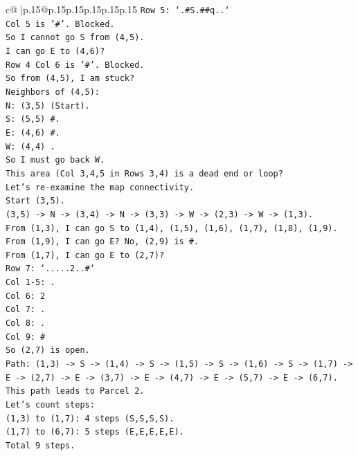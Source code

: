 \documentclass{article}
\begin{document}
{\begin{supertabular}{c@{$\;$}|p{.15\linewidth}@{}p{.15\linewidth}p{.15\linewidth}p{.15\linewidth}p{.15\linewidth}p{.15\linewidth}}
{{{\texttt{Row 5: `.\#S.\#\#q..`} \\
\texttt{Col 5 is '\#'. Blocked.} \\
\texttt{So I cannot go S from (4,5).} \\
\texttt{I can go E to (4,6)?} \\
\texttt{Row 4 Col 6 is '\#'. Blocked.} \\
\texttt{So from (4,5), I am stuck?} \\
\texttt{Neighbors of (4,5):} \\
\texttt{N: (3,5) (Start).} \\
\texttt{S: (5,5) \#.} \\
\texttt{E: (4,6) \#.} \\
\texttt{W: (4,4) .} \\
\texttt{So I must go back W.} \\
\texttt{This area (Col 3,4,5 in Rows 3,4) is a dead end or loop?} \\
\texttt{Let's re{-}examine the map connectivity.} \\
\texttt{Start (3,5).} \\
\texttt{(3,5) {-}> N {-}> (3,4) {-}> N {-}> (3,3) {-}> W {-}> (2,3) {-}> W {-}> (1,3).} \\
\texttt{From (1,3), I can go S to (1,4), (1,5), (1,6), (1,7), (1,8), (1,9).} \\
\texttt{From (1,9), I can go E? No, (2,9) is \#.} \\
\texttt{From (1,7), I can go E to (2,7)?} \\
\texttt{Row 7: `.....2..\#`} \\
\texttt{Col 1{-}5: .} \\
\texttt{Col 6: 2} \\
\texttt{Col 7: .} \\
\texttt{Col 8: .} \\
\texttt{Col 9: \#} \\
\texttt{So (2,7) is open.} \\
\texttt{Path: (1,3) {-}> S {-}> (1,4) {-}> S {-}> (1,5) {-}> S {-}> (1,6) {-}> S {-}> (1,7) {-}> E {-}> (2,7) {-}> E {-}> (3,7) {-}> E {-}> (4,7) {-}> E {-}> (5,7) {-}> E {-}> (6,7).} \\
\texttt{This path leads to Parcel 2.} \\
\texttt{Let's count steps:} \\
\texttt{(1,3) to (1,7): 4 steps (S,S,S,S).} \\
\texttt{(1,7) to (6,7): 5 steps (E,E,E,E,E).} \\
\texttt{Total 9 steps.} \\
}}}
\end{supertabular}}
\end{document}
